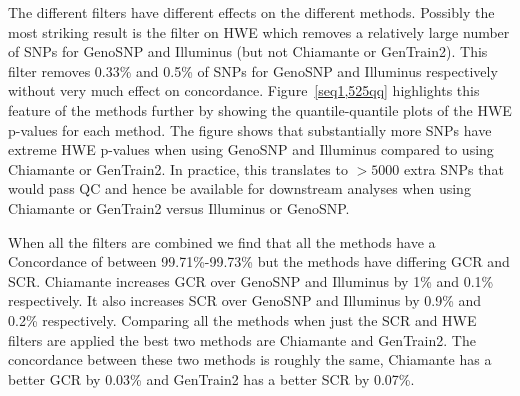 The different filters have different effects on the different methods. Possibly the most striking result is the filter on HWE which removes a relatively large number of SNPs for GenoSNP and Illuminus (but not Chiamante or GenTrain2). This filter removes 0.33\% and 0.5\% of SNPs for GenoSNP and Illuminus respectively without very much effect on concordance. Figure~\ref{seq1,525qq} highlights this feature of the methods further by showing the quantile-quantile plots of the HWE p-values for each method. The figure shows that substantially more SNPs have extreme HWE p-values when using GenoSNP and Illuminus compared to using Chiamante or GenTrain2. In practice, this translates to $>5000$ extra SNPs that would pass QC and hence be available for downstream analyses when using Chiamante or GenTrain2 versus Illuminus or GenoSNP.

When all the filters are combined we find that all the methods have a Concordance of between 99.71\%-99.73\% but the methods have differing GCR and SCR. Chiamante increases GCR over GenoSNP and Illuminus by 1\% and 0.1\% respectively. It also increases SCR over GenoSNP and Illuminus by 0.9\% and 0.2\% respectively. Comparing all the methods when just the SCR and HWE filters are applied the best two methods are Chiamante and GenTrain2. The concordance between these two methods is roughly the same, Chiamante has a better GCR by 0.03\% and GenTrain2 has a better SCR by 0.07\%. 

